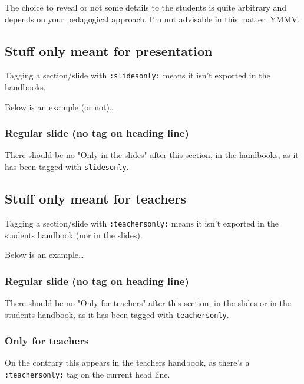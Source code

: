\documentclass[a4paper]{article}
\newenvironment{NOTES}{\begin{lrbox}{\mybox}\begin{minipage}{0.9\textwidth}\begin{shaded}}{\end{shaded}\end{minipage}\end{lrbox}\fbox{\usebox{\mybox}}}
\begin{document}
\begin{NOTES}
The choice to reveal or not some details to the students is quite arbitrary and depends on your pedagogical approach. I'm not advisable in this matter. YMMV.
\end{NOTES}

\subsection{Stuff only meant for presentation}
\label{sec:orgcb1f956}

Tagging a section/slide with \texttt{:slidesonly:} means it isn't exported in the handbooks.

Below is an example (or not)\ldots{}

\subsubsection{Regular slide (no tag on heading line)}
\label{sec:org391f453}

There should be no "Only in the slides" after this section, in the
handbooks, as it has been tagged with \texttt{slidesonly}.

\subsection{Stuff only meant for teachers}
\label{sec:orgfce3e94}

Tagging a section/slide with \texttt{:teachersonly:} means it isn't exported in the students handbook (nor in the slides).

Below is an example\ldots{}

\subsubsection{Regular slide (no tag on heading line)}
\label{sec:org75452f6}

There should be no "Only for teachers" after this section, in the slides or in the
students handbook, as it has been tagged with \texttt{teachersonly}.

\subsubsection{Only for teachers}
\label{sec:orgb3067eb}

On the contrary this appears in the teachers handbook, as there's a \texttt{:teachersonly:} tag on the current head line.
\end{document}
